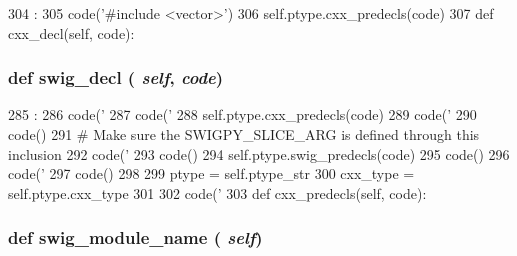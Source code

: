 \begin{DoxyCode}
304                                 :
305         code('#include <vector>')
306         self.ptype.cxx_predecls(code)
307 
    def cxx_decl(self, code):
\end{DoxyCode}
\hypertarget{classm5_1_1params_1_1VectorParamDesc_a83526365333b680bfcbd9b037527cc25}{
\subsubsection[{swig\_\-decl}]{\setlength{\rightskip}{0pt plus 5cm}def swig\_\-decl ( {\em self}, \/   {\em code})}}
\label{classm5_1_1params_1_1VectorParamDesc_a83526365333b680bfcbd9b037527cc25}



\begin{DoxyCode}
285                              :
286         code('%
287         code('%
288         self.ptype.cxx_predecls(code)
289         code('%
290         code()
291         # Make sure the SWIGPY_SLICE_ARG is defined through this inclusion
292         code('%
293         code()
294         self.ptype.swig_predecls(code)
295         code()
296         code('%
297         code()
298 
299         ptype = self.ptype_str
300         cxx_type = self.ptype.cxx_type
301 
302         code('%
303 
    def cxx_predecls(self, code):
\end{DoxyCode}
\hypertarget{classm5_1_1params_1_1VectorParamDesc_af01ddd9d6f03f6acd217b51e01a920bd}{
\subsubsection[{swig\_\-module\_\-name}]{\setlength{\rightskip}{0pt plus 5cm}def swig\_\-module\_\-name ( {\em self})}}
\label{classm5_1_1params_1_1VectorParamDesc_af01ddd9d6f03f6acd217b51e01a920bd}



